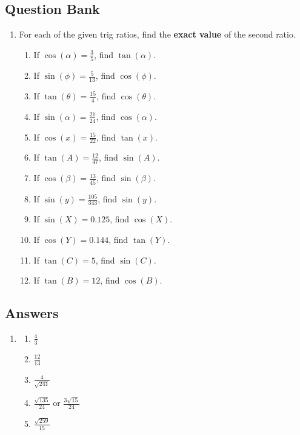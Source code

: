 \documentclass[a4paper,12pt]{article}
\begin{document}
\newpage
\subsection*{Question Bank}

\begin{enumerate}
\item For each of the given trig ratios, find the \textbf{exact 
value} of the second ratio.
    \begin{enumerate}
    \item If $\cos(\alpha) = \frac{3}{5}$, find $\tan(\alpha)$.
    \item If $\sin(\phi) = \frac{5}{13}$, find $\cos(\phi)$.
    \item If $\tan(\theta) = \frac{15}{4}$, find $\cos(\theta)$.
    \item If $\sin(\alpha) = \frac{21}{24}$, find $\cos(\alpha)$.
    \item If $\cos(x) = \frac{15}{22}$, find $\tan(x)$.
    \item If $\tan(A) = \frac{12}{47}$, find $\sin(A)$.
    \item If $\cos(\beta) = \frac{13}{45}$, find $\sin(\beta)$.
    \item If $\sin(y) = \frac{105}{343}$, find $\sin(y)$.

    \item If $\sin(X) = 0.125$, find $\cos(X)$.
    \item If $\cos(Y) = 0.144$, find $\tan(Y)$.
    \item If $\tan(C) = 5$, find $\sin(C)$.
    \item If $\tan(B) = 12$, find $\cos(B)$.
    \end{enumerate}
\end{enumerate}

\newpage
\subsection*{Answers}

\begin{enumerate}
\item 
    \begin{multicols}{2}
    \begin{enumerate}
    \item $\frac{4}{3}$
    \item $\frac{12}{13}$
    \item $\frac{4}{\sqrt{241}}$
    \item $\frac{\sqrt{135}}{24}$ or $\frac{3\sqrt{15}}{24}$
    \item $\frac{\sqrt{259}}{15}$
    \end{enumerate}
    \end{multicols}
\end{enumerate}
\end{document}
